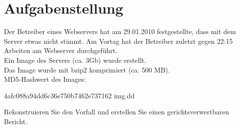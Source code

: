 \section{Aufgabenstellung}

Der Betreiber eines Webservers hat am 29.01.2010 festgestellte, dass mit dem Server etwas nicht stimmt. Am Vortag hat der Betreiber zuletzt gegen 22:15 Arbeiten am Webserver durchgeführt.
\\Ein Image des Servers (ca. 3Gb) wurde erstellt.
\\Das Image wurde mit bzip2 komprimiert (ca. 500 MB).
\\MD5-Hashwert des Images:
\begin{center}
4afc088a94dd6c36e750b7462e737162  img.dd
\end{center}

Rekonstruieren Sie den Vorfall und erstellen Sie einen gerichtsverwertbaren Bericht.